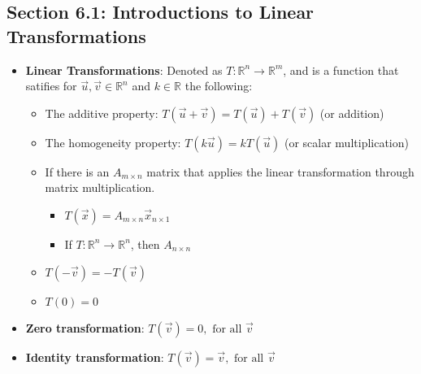 \documentclass[15pt]{article}
\begin{document}
\begin{flushleft}
\section{\textbf{Section 6.1}: Introductions to Linear Transformations}
\begin{itemize}
    \item \textbf{Linear Transformations}: Denoted as $T: \mathbb{R}^n \to 
          \mathbb{R}^m$, and is a function that satifies for $\vec{u}, \vec{v} 
          \in \mathbb{R}^n$ and $k \in \mathbb{R}$ the following:
          \begin{itemize}
                \item The additive property: $T(\vec{u} + \vec{v}) = T(\vec{u})
                        + T(\vec{v})$ (or addition)
                \item The homogeneity property: $T(k\vec{u}) = kT(\vec{u})$ (or 
                        scalar multiplication)
                \item If there is an $A_{m \times n}$ matrix that applies the 
                        linear transformation through matrix multiplication.
                        \begin{itemize}
                                \item $T(\vec{x}) = A_{m \times n} \vec{x}_{n 
                                        \times 1}$
                                \item If $T: \mathbb{R}^n \to \mathbb{R}^n$,
                                        then $A_{n \times n}$
                        \end{itemize}
                \item $T(-\vec{v}) = -T(\vec{v})$
                \item $T(0) = 0$
          \end{itemize}
     \item \textbf{Zero transformation}: $T(\vec{v}) = 0, \text{ for all } 
           \vec{v}$
     \item \textbf{Identity transformation}: $T(\vec{v}) = \vec{v}, 
           \text{ for all } \vec{v}$
\end{itemize}


\end{flushleft}
\end{document}
